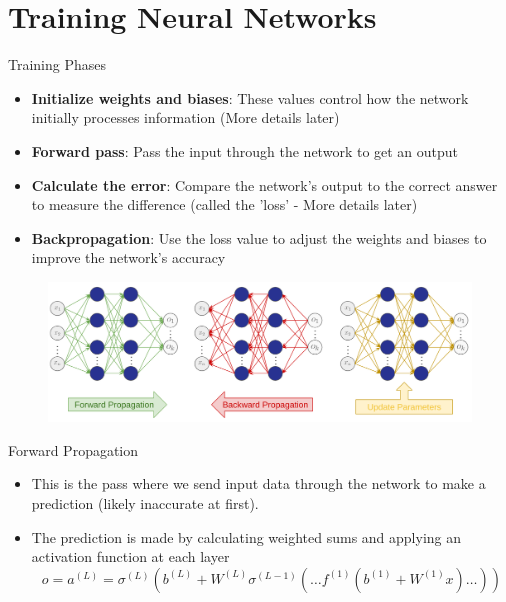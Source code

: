\documentclass[serif, aspectratio=169]{beamer}
\begin{document}
\section{Training Neural Networks}
\begin{frame}{Training Phases}
    \begin{itemize}
        \item \textbf{Initialize weights and biases}: These values control how the network initially processes information (More details later)
        \item \textbf{Forward pass}: Pass the input through the network to get an output
        \item \textbf{Calculate the error}: Compare the network's output to the correct answer to measure the difference (called the 'loss' - More details later) 
        \item \textbf{Backpropagation}: Use the loss value to adjust the weights and biases to improve the network's accuracy
    \end{itemize}
    \begin{figure}[bh]
            \includegraphics[keepaspectratio, scale=0.2]{pic/4/training-phases.png}
    \end{figure}
\end{frame}

\begin{frame}[t]{Forward Propagation}
    \begin{itemize}
        \item This is the pass where we send input data through the network to make a prediction (likely inaccurate at first).
        \item The prediction is made by calculating weighted sums and applying an activation function at each layer
        $$ o = a^{(L)} = \sigma^{(L)}\left( b^{(L)} + W^{(L)}  \sigma^{(L-1)}\left( \ldots f^{(1)}(b^{(1)} + W^{(1)}  x)  \ldots \right) \right) $$
    \end{itemize}
\end{frame}
\end{document}
